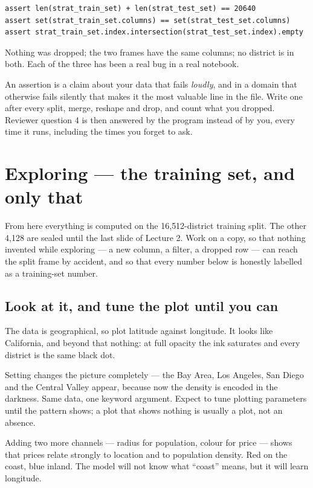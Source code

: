\documentclass[11pt,a4paper]{article}
\begin{document}
\begin{keybox}[title={Three lines, three real bugs}]
\begin{verbatim}
assert len(strat_train_set) + len(strat_test_set) == 20640
assert set(strat_train_set.columns) == set(strat_test_set.columns)
assert strat_train_set.index.intersection(strat_test_set.index).empty
\end{verbatim}
Nothing was dropped; the two frames have the same columns; no district is in
both. Each of the three has been a real bug in a real notebook.
\end{keybox}

An assertion is a claim about your data that fails \emph{loudly}, and in a
domain that otherwise fails silently that makes it the most valuable line in
the file. Write one after every split, merge, reshape and drop, and count what
you dropped. Reviewer question 4 is then answered by the program instead of by
you, every time it runs, including the times you forget to ask.

\section{Exploring --- the training set, and only that}

From here everything is computed on the 16{,}512-district training split. The
other 4{,}128 are sealed until the last slide of Lecture 2. Work on a copy, so
that nothing invented while exploring --- a new column, a filter, a dropped row
--- can reach the split frame by accident, and so that every number below is
honestly labelled as a training-set number.

\subsection{Look at it, and tune the plot until you can}

The data is geographical, so plot latitude against longitude. It looks like
California, and beyond that nothing: at full opacity the ink saturates and
every district is the same black dot.

Setting  changes the picture completely --- the Bay Area, Los
Angeles, San Diego and the Central Valley appear, because now the density is
encoded in the darkness. Same data, one keyword argument. Expect to tune
plotting parameters until the pattern shows; a plot that shows nothing is
usually a plot, not an absence.

Adding two more channels --- radius for population, colour for price --- shows
that prices relate strongly to location and to population density. Red on the
coast, blue inland. The model will not know what ``coast'' means, but it will
learn longitude.
\end{document}
